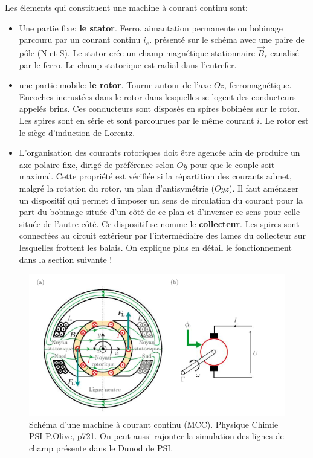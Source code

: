 \documentclass[french, a4paper, 10pt, twocolumn, landscape]{article}
\begin{document}
Les élements qui constituent une machine à courant continu sont: 
\begin{itemize}
	\item Une partie fixe: \textbf{le stator}. Ferro. aimantation permanente ou bobinage parcouru par un courant continu $i_e$. présenté sur le schéma avec une paire de pôle (N et S). Le stator crée un champ magnétique stationnaire $\vec{B}_s$ canalisé par le ferro. Le champ statorique est radial dans l'entrefer.
	
	\item une partie mobile: \textbf{le rotor}. Tourne autour de l'axe $Oz$, ferromagnétique. Encoches incrustées dans le rotor dans lesquelles se logent des conducteurs appelés \og{}brins\fg{}. Ces conducteurs sont disposés en spires bobinées sur le rotor. Les spires sont en série et sont parcourues par le même courant $i$. Le rotor est le siège d'induction de Lorentz.
	
	\item L'organisation des courants rotoriques doit être agencée afin de produire un axe polaire fixe, dirigé de préférence selon $Oy$ pour que le couple soit maximal. Cette propriété est vérifiée si la répartition des courants admet, malgré la rotation du rotor, un plan d'antisymétrie ($Oyz$). Il faut aménager un dispositif qui permet d'imposer un sens de circulation du courant pour la part du bobinage située d'un côté de ce plan et d'inverser ce sens pour celle située de l'autre côté. Ce dispositif se nomme le \textbf{collecteur}. Les spires sont connectées au circuit extérieur par l'intermédiaire des lames du collecteur sur lesquelles frottent les balais. On explique plus en détail le fonctionnement dans la section suivante !
\end{itemize}
\begin{figure}[ht]
	\centering
	\includegraphics[width=.5\linewidth]{./figures/StructureMCC.png}
	\caption{Schéma d'une machine à courant continu (MCC). Physique Chimie PSI P.Olive, p721. On peut aussi rajouter la simulation des lignes de champ présente dans le Dunod de PSI.}
\end{figure}
\end{document}
